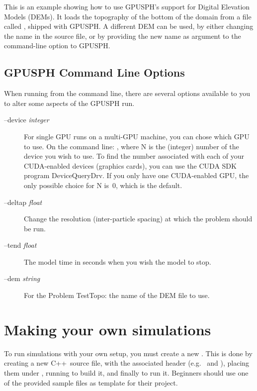 \documentclass[12pt]{memoir}
\newcommand{\cpp}{{\sffamily C\ttfamily++}}
\begin{document}
This is an example showing how to use GPUSPH's support for Digital
Elevation Models (DEMs). It loads the topography of the bottom of the
domain from a file called , shipped with GPUSPH.
A different DEM can be used, by either changing the name in the source
 file, or by providing the new name as argument to the
 command-line option to GPUSPH.


\section{GPUSPH Command Line Options}\label{options}

When running from the command line, there are several options available
to you to alter some aspects of the GPUSPH run.

\begin{description}
\item[--device \emph{integer}]
For single GPU runs on a multi-GPU machine, you can chose which GPU to
use. On the command line: , where N is the
(integer) number of the device you wish to use. To find the number
associated with each of your CUDA-enabled devices (graphics cards), you
can use the CUDA SDK program DeviceQueryDrv. If you only have one
CUDA-enabled GPU, the only possible choice for N is~0, which is the
default.
\item[--deltap \emph{float}]
Change the resolution (inter-particle spacing) at which the problem
should be run.
\item[--tend \emph{float}]
The model time in seconds when you wish the model to stop.
\item[--dem \emph{string}]
For the Problem TestTopo: the name of the DEM file to use.
\end{description}


\chapter{Making your own simulations}

To run simulations with your own setup, you must create a new
. This is done by creating a new \cpp\ source file, with
the associated header (e.g.\  and ),
placing them under , running  to
build it, and finally  to run it. Beginners should use one
of the provided sample files as template for their project.
\end{document}

